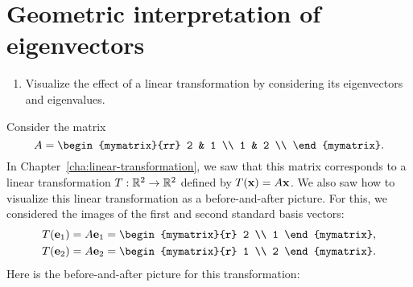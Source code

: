 \section{Geometric interpretation of eigenvectors}

\begin{outcome}
  \begin{enumerate}
  \item Visualize the effect of a linear transformation by
    considering its eigenvectors and eigenvalues.
  \end{enumerate}
\end{outcome}

Consider the matrix
\begin{equation*}
  A = \begin{mymatrix}{rr}
    2 & 1 \\
    1 & 2 \\
  \end{mymatrix}.
\end{equation*}
In Chapter~\ref{cha:linear-transformation}, we saw that this matrix
corresponds to a linear transformation $T : \mathbb{R}^2\to\mathbb{R}^2$ defined by
$T(\vect{x}) = A\vect{x}$. We also saw how to visualize this linear
transformation as a before-and-after picture. For this, we
considered the images of the first and second standard basis vectors:
\begin{align*}
  T(\vect{e}_1) &= A\vect{e}_1 = \begin{mymatrix}{r} 2 \\ 1 \end{mymatrix}, \\
  T(\vect{e}_2) &= A\vect{e}_2 = \begin{mymatrix}{r} 1 \\ 2 \end{mymatrix}.
\end{align*}
Here is the before-and-after picture for this transformation:
\vspace{-2cm}
